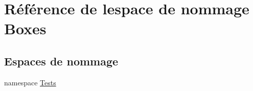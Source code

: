 \hypertarget{namespace_boxes}{}\section{Référence de l\textquotesingle{}espace de nommage Boxes}
\label{namespace_boxes}
\subsection*{Espaces de nommage}
\begin{DoxyCompactItemize}
\item 
namespace \hyperlink{namespace_boxes_1_1_tests}{Tests}
\end{DoxyCompactItemize}
